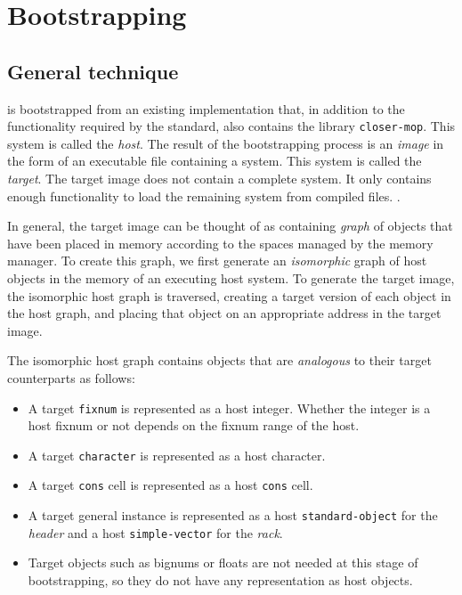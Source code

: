 \chapter{Bootstrapping}

\section{General technique}

\sysname{} is bootstrapped from an existing \commonlisp{}
implementation that, in addition to the functionality required by the
standard, also contains the library \texttt{closer-mop}.  This
\commonlisp{} system is called the \emph{host}.  The result of the
bootstrapping process is an \emph{image} in the form of an executable
file containing a \sysname{} system.  This system is called the
\emph{target}.  The target image does not contain a complete
\commonlisp{} system.  It only contains enough functionality to load
the remaining system from compiled files.
.

In general, the target image can be thought of as containing
\emph{graph} of \commonlisp{} objects that have been placed in memory
according to the spaces managed by the memory manager.  To create this
graph, we first generate an \emph{isomorphic} graph of host objects in
the memory of an executing host system.  To generate the target image,
the isomorphic host graph is traversed, creating a target version of
each object in the host graph, and placing that object on an
appropriate address in the target image.

The isomorphic host graph contains objects that are \emph{analogous}
to their target counterparts as follows:

\begin{itemize}
\item A target \texttt{fixnum} is represented as a host integer.
  Whether the integer is a host fixnum or not depends on the fixnum
  range of the host.
\item A target \texttt{character} is represented as a host character.
\item A target \texttt{cons} cell is represented as a host
  \texttt{cons} cell.
\item A target general instance is represented as a host
  \texttt{standard-object} for the \emph{header} and a host
  \texttt{simple-vector} for the \emph{rack}.
\item Target objects such as bignums or floats are not needed at this
  stage of bootstrapping, so they do not have any representation as
  host objects.
\end{itemize}


